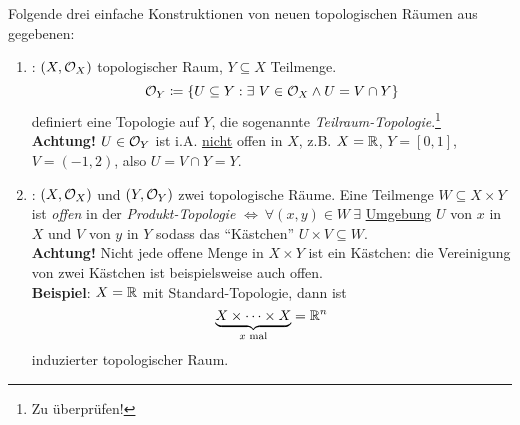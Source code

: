 \begin{remark}
  Folgende drei einfache Konstruktionen von neuen topologischen Räumen aus gegebenen:
  \begin{enumerate}

    \item {}\label{def:teilraumtopologie}: $ (X, \mathcal{O}_X) $ topologischer Raum, $ Y \subseteq X $ Teilmenge.
    \begin{equation*}
      \mathcal{O}_Y \coloneqq \{ U \subseteq Y : \exists \ V \in \mathcal{O}_X \wedge U = V \cap Y \}
    \end{equation*}
    definiert eine Topologie auf $ Y $, die sogenannte \emph{Teilraum-Topologie}.\footnote{Zu überprüfen!} \\
    \textbf{Achtung!} $ U \in \mathcal{O}_Y $ ist i.A. \underline{nicht} offen in $ X $, z.B. $ X = \mathbb{R} $, $ Y = [0,1] $, $ V = (-1, 2) $, also $ U = V \cap Y = Y $.

    \item {}\label{def:produkttopologie}: $ (X, \mathcal{O}_X) $ und $ (Y, \mathcal{O}_Y) $ zwei topologische Räume. Eine Teilmenge $ W \subseteq X \times Y $ ist \emph{offen} in der \emph{Produkt-Topologie} $ \Leftrightarrow \ \forall (x, y) \in W \ \exists $ \hyperref[def:umgebung]{Umgebung} $ U $ von $ x $ in $ X $ und $ V $ von $ y $ in $ Y $ sodass das ``Kästchen'' $ U \times V \subseteq W $. \\
    \textbf{Achtung!} Nicht jede offene Menge in $ X \times Y $ ist ein Kästchen: die Vereinigung von zwei Kästchen ist beispielsweise auch offen. \\
    \textbf{Beispiel}: $ X = \mathbb{R} $ mit Standard-Topologie, dann ist
    \begin{equation*}
      \underbrace{X \times \cdots \times X}_{x \text{ mal}} = \mathbb{R}^n
    \end{equation*}
    induzierter topologischer Raum.


\end{enumerate}
\end{remark}
